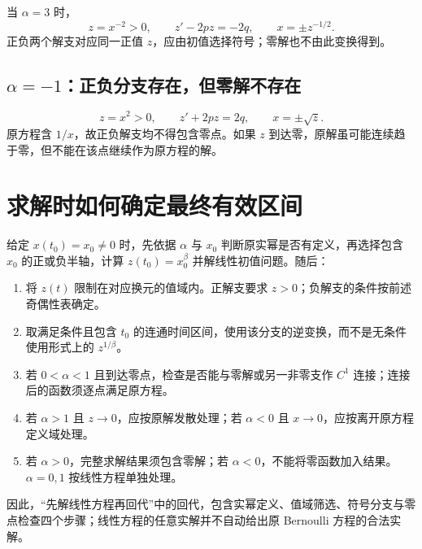\documentclass[11pt,a4paper]{ctexart}
\begin{document}
当 $\alpha=3$ 时，
\[
z=x^{-2}>0,\qquad z'-2pz=-2q,\qquad x=\pm z^{-1/2}.
\]
正负两个解支对应同一正值 $z$，应由初值选择符号；零解也不由此变换得到。

\subsection{$\alpha=-1$：正负分支存在，但零解不存在}
\[
z=x^2>0,\qquad z'+2pz=2q,\qquad x=\pm\sqrt z.
\]
原方程含 $1/x$，故正负解支均不得包含零点。如果 $z$ 到达零，原解虽可能连续趋于零，但不能在该点继续作为原方程的解。

\section{求解时如何确定最终有效区间}
给定 $x(t_0)=x_0\ne0$ 时，先依据 $\alpha$ 与 $x_0$ 判断原实幂是否有定义，再选择包含 $x_0$ 的正或负半轴，计算 $z(t_0)=x_0^\beta$ 并解线性初值问题。随后：
\begin{enumerate}
\item 将 $z(t)$ 限制在对应换元的值域内。正解支要求 $z>0$；负解支的条件按前述奇偶性表确定。
\item 取满足条件且包含 $t_0$ 的连通时间区间，使用该分支的逆变换，而不是无条件使用形式上的 $z^{1/\beta}$。
\item 若 $0<\alpha<1$ 且到达零点，检查是否能与零解或另一非零支作 $C^1$ 连接；连接后的函数须逐点满足原方程。
\item 若 $\alpha>1$ 且 $z\to0$，应按原解发散处理；若 $\alpha<0$ 且 $x\to0$，应按离开原方程定义域处理。
\item 若 $\alpha>0$，完整求解结果须包含零解；若 $\alpha<0$，不能将零函数加入结果。$\alpha=0,1$ 按线性方程单独处理。
\end{enumerate}
因此，“先解线性方程再回代”中的回代，包含实幂定义、值域筛选、符号分支与零点检查四个步骤；线性方程的任意实解并不自动给出原 Bernoulli 方程的合法实解。
\end{document}
